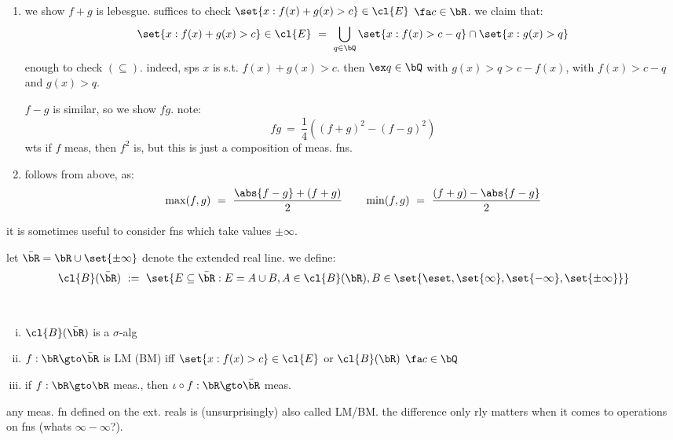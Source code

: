 \begin{pf} \vspace{-0.2in}
	\begin{enumerate}
		\item[iii)] we show $f+g$ is lebesgue.
			suffices to check $\set{x:f(x)+g(x)>c}\in\cl{E}$ $\fa c\in\bR$.
			we claim that:
			\begin{equation*}
				\set{x:f(x)+g(x)>c}\in\cl{E}
				\ = \ \bigcup_{q\in\bQ}\set{x:f(x)>c-q}\cap\set{x:g(x)>q}
			\end{equation*}
			enough to check $(\subseteq)$.
			indeed, sps $x$ is s.t. $f(x)+g(x)>c$.
			then $\ex q\in\bQ$ with $g(x)>q>c-f(x)$, with
			$f(x)>c-q$ and $g(x)>q$.

			$f-g$ is similar, so we show $fg$. note:
			\begin{equation*}
				fg \ = \ \frac{1}{4}\left((f+g)^{2}-(f-g)^{2}\right)
			\end{equation*}
			wts if $f$ meas, then $f^{2}$ is,
			but this is just a composition of meas. fns.
		\item [iv)] follows from above, as:
			\begin{equation*}
				\max(f,g) \ = \ \frac{\abs{f-g}+(f+g)}{2} \qquad
				\min(f,g) \ = \ \frac{(f+g)-\abs{f-g}}{2}
			\end{equation*}
	\end{enumerate}
\end{pf}

it is sometimes useful to consider fns which take values $\pm \infty$.
\begin{defn}
	let $\bar{\bR}=\bR\cup\set{\pm \infty}$ denote the extended real line.
	we define:
	\begin{equation*}
		\cl{B}(\bar{\bR}) \ := \
		\set{E\subseteq\bar{\bR}:E=A\cup B,A\in\cl{B}(\bR),B\in\set{\eset,\set{\infty},\set{-\infty},\set{\pm \infty}}}
	\end{equation*}
\end{defn} \

\begin{exr} \vspace{-0.2in}
	\begin{enumerate}[i)]
		\item $\cl{B}(\bar{\bR})$ is a $\sigma$-alg
		\item $f:\bR\gto\bar{\bR}$ is LM (BM) iff
			$\set{x:f(x)>c}\in\cl{E}$ or $\cl{B}(\bR)$ $\fa c\in\bQ$
		\item if $f:\bR\gto\bR$ meas., then $\iota\circ f:\bR\gto\bar{\bR}$ meas.
	\end{enumerate}
\end{exr}
any meas. fn defined on the ext. reals is (unsurprisingly) also called LM/BM.
the difference only rly matters when it comes to operations on fns (whats $\infty-\infty$?).

